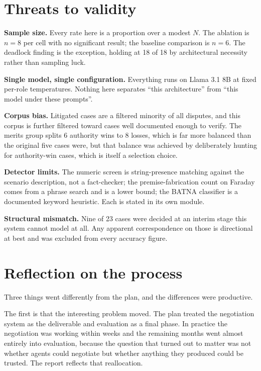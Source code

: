 \section{Threats to validity}
\label{sec:threats}

\textbf{Sample size.} Every rate here is a proportion over a modest $N$. The
ablation is $n=8$ per cell with no significant result; the baseline comparison is
$n=6$. The deadlock finding is the exception, holding at 18 of 18 by architectural
necessity rather than sampling luck.

\textbf{Single model, single configuration.} Everything runs on Llama 3.1 8B at
fixed per-role temperatures. Nothing here separates ``this architecture'' from
``this model under these prompts''.

\textbf{Corpus bias.} Litigated cases are a filtered minority of all disputes, and
this corpus is further filtered toward cases well documented enough to verify. The
merits group splits 6 authority wins to 8 losses, which is far more balanced than
the original five cases were, but that balance was achieved by deliberately hunting
for authority-win cases, which is itself a selection choice.

\textbf{Detector limits.} The numeric screen is string-presence matching against
the scenario description, not a fact-checker; the premise-fabrication count on
Faraday comes from a phrase search and is a lower bound; the BATNA classifier is a
documented keyword heuristic. Each is stated in its own module.

\textbf{Structural mismatch.} Nine of 23 cases were decided at an interim stage
this system cannot model at all. Any apparent correspondence on those is
directional at best and was excluded from every accuracy figure.

\section{Reflection on the process}
\label{sec:reflection}

Three things went differently from the plan, and the differences were productive.

The first is that the interesting problem moved. The plan treated the negotiation
system as the deliverable and evaluation as a final phase. In practice the
negotiation was working within weeks and the remaining months went almost entirely
into evaluation, because the question that turned out to matter was not whether
agents could negotiate but whether anything they produced could be trusted. The
report reflects that reallocation.

